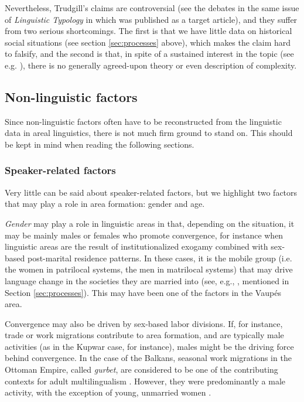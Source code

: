 \documentclass[output=paper,
modfonts
]{langscibook}
\begin{document}
Nevertheless, Trudgill's claims are controversial (see the debates in the same issue of \textit{Linguistic Typology} in which \textcite{trudgill2004linguistic} was published as a target article), and they suffer from two serious shortcomings. The first is that we have little data on historical social situations (see section \ref{sec:processes} above), which makes the claim hard to falsify, and the second is that, in spite of a sustained interest in the topic (see e.g. \citealt{kusters2003linguistic, dahl2004growth, miestamoetal2008language,baermanetal2015understanding}), there is no generally agreed-upon theory or even description of complexity.

\subsection{Non-linguistic factors} \label{subsec:nonlingfactors}

Since non-linguistic factors often have to be reconstructed from the linguistic data in areal linguistics, there is not much firm ground to stand on. This should be kept in mind when reading the following sections.

\subsubsection{Speaker-related factors}

Very little can be said about speaker-related factors, but we highlight two factors that may play a role in area formation: gender and age.

\textit{Gender} may play a role in linguistic areas in that, depending on the situation, it may be mainly males or females who promote convergence, for instance when linguistic areas are the result of institutionalized exogamy combined with sex-based post-marital residence patterns. In these cases, it is the mobile group (i.e. the women in patrilocal systems, the men in matrilocal systems) that may drive language change in the societies they are married into (see, e.g., \citealt{morozova17}, mentioned in Section \ref{sec:processes}). This may have been one of the factors in the Vaupés area.

Convergence may also be driven by sex-based labor divisions. If, for instance, trade or work migrations contribute to area formation, and  are typically male activities (as in the Kupwar case, for instance), males might be the driving force behind convergence. In the case of the Balkans, seasonal work migrations in the Ottoman Empire, called \textit{gurbet}, are considered to be one of the contributing contexts for adult multilingualism \parencite{lindstedt2018}. However, they were predominantly a male activity, with the exception of young, unmarried women \parencite[3–5]{hristov2008}. 
\end{document}
